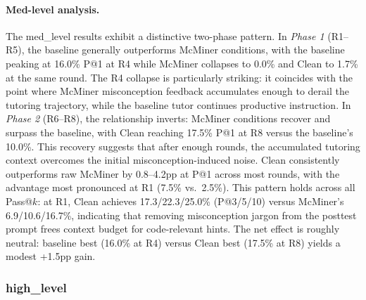 \documentclass[11pt]{article}
\begin{document}
\paragraph{Med-level analysis.} The med\_level results exhibit a distinctive two-phase pattern. In \emph{Phase 1} (R1--R5), the baseline generally outperforms McMiner conditions, with the baseline peaking at 16.0\% P@1 at R4 while McMiner collapses to 0.0\% and Clean to 1.7\% at the same round. The R4 collapse is particularly striking: it coincides with the point where McMiner misconception feedback accumulates enough to derail the tutoring trajectory, while the baseline tutor continues productive instruction. In \emph{Phase 2} (R6--R8), the relationship inverts: McMiner conditions recover and surpass the baseline, with Clean reaching 17.5\% P@1 at R8 versus the baseline's 10.0\%. This recovery suggests that after enough rounds, the accumulated tutoring context overcomes the initial misconception-induced noise. Clean consistently outperforms raw McMiner by 0.8--4.2pp at P@1 across most rounds, with the advantage most pronounced at R1 (7.5\% vs.\ 2.5\%). This pattern holds across all Pass@$k$: at R1, Clean achieves 17.3/22.3/25.0\% (P@3/5/10) versus McMiner's 6.9/10.6/16.7\%, indicating that removing misconception jargon from the posttest prompt frees context budget for code-relevant hints. The net effect is roughly neutral: baseline best (16.0\% at R4) versus Clean best (17.5\% at R8) yields a modest +1.5pp gain.

\subsubsection{high\_level}
\end{document}
